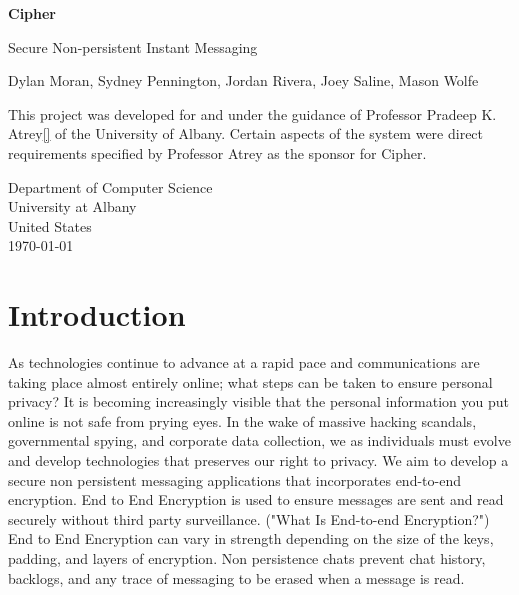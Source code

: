 \documentclass[11pt]{article}
\theoremstyle{plain}
\theoremstyle{definition}
\begin{document}
\begin{titlepage}
   \begin{center}
   
    \vspace*{1cm}
    \Huge{
        
        \textbf{Cipher}
    }
    
    \vspace{0.5cm}
    \Huge{
        Secure Non-persistent Instant Messaging
    }
    
    \vspace{1.5cm}
    \large{
        Dylan Moran, Sydney Pennington, Jordan Rivera, Joey Saline, Mason Wolfe
    }

    \vfill
    This project was developed for and under the guidance of Professor Pradeep K. Atrey\ref{} of the University of Albany. Certain aspects of the system were direct requirements specified by Professor Atrey as the sponsor for Cipher.
            
    \vspace{0.8cm}
                 
    Department of Computer Science\\
    University at Albany\\
    United States\\
    \today
            
   \end{center}
\end{titlepage}



\section{Introduction}\label{sec:intro}
As technologies continue to advance at a rapid pace and communications are taking place almost entirely online; what steps can be taken to ensure personal privacy? It is becoming increasingly visible that the personal information you put online is not safe from prying eyes. In the wake of massive hacking scandals, governmental spying, and corporate data collection, we as individuals must evolve and develop technologies that preserves our right to privacy. We aim to develop a secure non persistent messaging applications that incorporates end-to-end encryption. End to End Encryption is used to ensure messages are sent and read securely without third party surveillance. ("What Is End-to-end Encryption?") End to End Encryption can vary in strength depending on the size of the keys, padding, and layers of encryption. Non persistence chats prevent chat history, backlogs, and any trace of messaging to be erased when a message is read.
\end{document}
